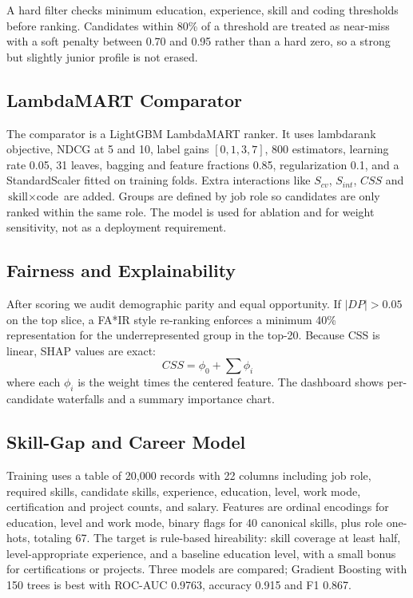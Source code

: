 \documentclass[conference]{IEEEtran}
\begin{document}
A hard filter checks minimum education, experience, skill and coding thresholds before ranking. Candidates within 80\% of a threshold are treated as near-miss with a soft penalty between 0.70 and 0.95 rather than a hard zero, so a strong but slightly junior profile is not erased.

\subsection{LambdaMART Comparator}
The comparator is a LightGBM LambdaMART ranker. It uses lambdarank objective, NDCG at 5 and 10, label gains $[0,1,3,7]$, 800 estimators, learning rate 0.05, 31 leaves, bagging and feature fractions 0.85, regularization 0.1, and a StandardScaler fitted on training folds. Extra interactions like $S_{cv}$, $S_{int}$, $CSS$ and $\text{skill}\times\text{code}$ are added. Groups are defined by job role so candidates are only ranked within the same role. The model is used for ablation and for weight sensitivity, not as a deployment requirement.

\subsection{Fairness and Explainability}
After scoring we audit demographic parity and equal opportunity. If $|DP| > 0.05$ on the top slice, a FA*IR style re-ranking enforces a minimum 40\% representation for the underrepresented group in the top-20. Because CSS is linear, SHAP values are exact: 
\begin{equation}
CSS = \phi_0 + \sum \phi_i
\end{equation}
where each $\phi_i$ is the weight times the centered feature. The dashboard shows per-candidate waterfalls and a summary importance chart.

\subsection{Skill-Gap and Career Model}
Training uses a table of 20,000 records with 22 columns including job role, required skills, candidate skills, experience, education, level, work mode, certification and project counts, and salary. Features are ordinal encodings for education, level and work mode, binary flags for 40 canonical skills, plus role one-hots, totaling 67. The target is rule-based hireability: skill coverage at least half, level-appropriate experience, and a baseline education level, with a small bonus for certifications or projects. Three models are compared; Gradient Boosting with 150 trees is best with ROC-AUC 0.9763, accuracy 0.915 and F1 0.867.
\end{document}
